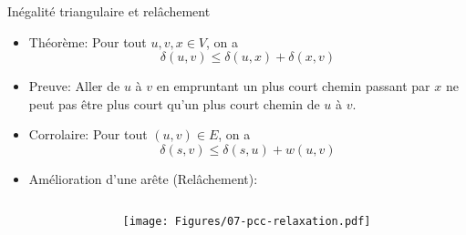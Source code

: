 \begin{frame}{Inégalité triangulaire et relâchement}
\begin{itemize}
\item \alert{Théorème:} Pour tout $u, v, x \in V$, on a
$$\delta(u,v)\leq \delta(u,x)+\delta(x,v)$$
\item \alert{Preuve:} Aller de $u$ à $v$ en empruntant un plus court chemin passant par $x$ ne peut pas être plus court qu'un plus court chemin de $u$ à $v$.

\bigskip

\item \alert{Corrolaire:} Pour tout $(u,v)\in E$, on a $$\delta(s,v)\leq \delta(s,u)+w(u,v)$$

\bigskip

\item Amélioration d'une arête (\alert{Relâchement}):
\end{itemize}

\begin{columns}
\begin{column}{5cm}
\begin{center}
{\small
{}}
\end{center}
\end{column}
\begin{column}{5cm}
\centerline{\texttt{[image: Figures/07-pcc-relaxation.pdf]}}
\end{column}
\end{columns}

\end{frame}

